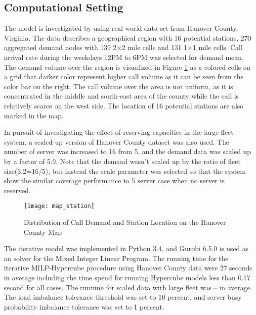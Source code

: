 \documentclass{article}
\begin{document}
\subsection{Computational Setting}

The model is investigated by using real-world data set from Hanover County, Virginia. The data describes a geographical region with 16 potential stations, 270 aggregated demand nodes with 139 2$\times $2 mile cells and 131 1$\times $1 mile cells. Call arrival rate during the weekdays 12PM to 6PM was selected for demand mean. The demand volume over the region is visualized in Figure \ref{fig:demand} as a colored cells on a grid that darker color represent higher call volume as it can be seen from the color bar on the right. The call volume over the area is not uniform, as it is concentrated in the middle and south-east area of the county while the call is relatively scarce on the west side. The location of 16 potential stations are also marked in the map.

In pursuit of investigating the effect of reserving capacities in the large fleet system, a scaled-up version of Hanover County dataset was also used. The number of server was increased to 16 from 5, and the demand data was scaled up by a factor of 5.9. Note that the demand wasn't scaled up by the ratio of fleet size(3.2=16/5), but instead the scale parameter was selected so that the system show the similar coverage performance to 5 server case when no server is reserved. 

\begin{figure}
\centering
\texttt{[image: map\_station]}
\caption{Distribution of Call Demand and Station Location on the Hanover County Map}
\label{fig:demand}
\end{figure}

The iterative model was implemented in Python 3.4, and Gurobi 6.5.0 is used as an solver for the Mixed Integer Linear Program. The running time for the iterative MILP-Hypercube procedure using Hanover County data were 27 seconds in average including the time spend for running Hypercube models less than 0.17 second for all cases. The runtime for scaled data with large fleet was -- in average. The load imbalance tolerance threshold was set to 10 percent, and server busy probability imbalance tolerance was set to 1 percent.
\end{document}
